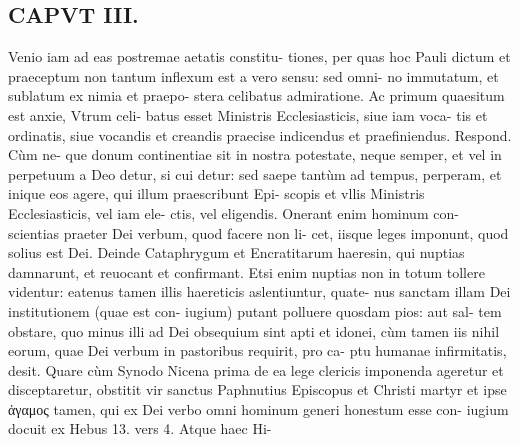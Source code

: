 \documentclass{article}
\begin{document}
\begin{pages}
\section*{CAPVT  III. }
\marginpar{[ p.111 ]}\pstart Venio iam ad eas postremae aetatis constitu- tiones, per quas hoc Pauli dictum et praeceptum non tantum inflexum est a vero sensu: sed omni- no immutatum, et sublatum ex nimia et praepo- stera celibatus admiratione.  \pend\pstart Ac primum quaesitum est anxie, Vtrum celi- batus esset Ministris Ecclesiasticis, siue iam voca- tis et ordinatis, siue vocandis et creandis praecise indicendus et praefiniendus. Respond. Cùm ne- que donum continentiae sit in nostra potestate, neque  semper, et vel in perpetuum a Deo detur, si cui detur: sed saepe tantùm ad tempus, perperam, et inique eos agere, qui illum praescribunt Epi- scopis et vllis Ministris Ecclesiasticis, vel iam ele- ctis, vel eligendis. Onerant enim hominum con- scientias praeter Dei verbum, quod facere non li- cet, iisque leges imponunt, quod solius est Dei. Deinde Cataphrygum et Encratitarum haeresin, qui nuptias damnarunt, et reuocant et confirmant. Etsi enim nuptias non in totum tollere videntur: eatenus tamen illis haereticis aslentiuntur, quate- nus sanctam illam Dei institutionem (quae est con- iugium) putant polluere quosdam pios: aut sal- tem obstare, quo minus illi ad Dei obsequium sint apti et idonei, cùm tamen iis nihil eorum, quae Dei verbum in pastoribus requirit, pro ca- ptu humanae infirmitatis, desit.  \pend\pstart Quare cùm Synodo Nicena prima de ea lege clericis imponenda ageretur et disceptaretur, obstitit vir sanctus Paphnutius Episcopus et Christi martyr et ipse ἀγαμος tamen, qui ex Dei verbo omni hominum generi honestum esse con- iugium docuit ex Hebus  13. vers 4. Atque haec Hi-  \pend

\end{pages}
\end{document}
